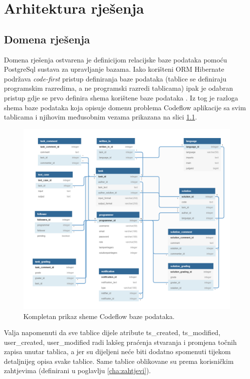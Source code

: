 \documentclass[times, utf8, zavrsni, numeric]{fer}
\begin{document}
	\chapter{Arhitektura rješenja}
		\section{Domena rješenja}
		\label{sec:domenarjesenja}
		Domena rješenja ostvarena je definicijom relacijske baze podataka pomoću PostgreSql sustava za upravljanje bazama. Iako korišteni ORM Hibernate podržava \textit{code-first} pristup definiranja baze podataka (tablice se definiraju  programskim razredima, a ne programski razredi tablicama) ipak je odabran pristup gdje se prvo definira shema korištene baze podataka . Iz tog je razloga shema baze podataka koja opisuje domenu problema Codeflow aplikacije sa svim tablicama i njihovim međusobnim vezama prikazana na slici \ref{fig:db}.
		\begin{figure}[H]
			\centering
			\includegraphics[width=\linewidth]{pictures/prikazi/Database.png}
			\caption{Kompletan prikaz sheme Codeflow baze podataka.}
			\label{fig:db}
		\end{figure}
		Valja napomenuti da sve tablice dijele atribute ts\_created, ts\_modified, user\_created, user\_modified radi lakšeg praćenja stvaranja i promjena točnih zapisa unutar tablica, a jer su dijeljeni neće biti dodatno spomenuti tijekom detaljnijeg opisa svake tablice. Same tablice oblikovane su prema korisničkim zahtjevima (definirani u poglavlju \ref{cha:zahtjevi}).
\end{document}
